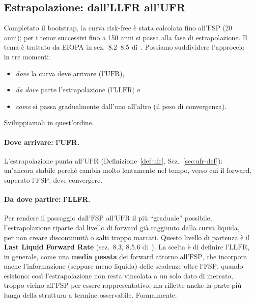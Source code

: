 \documentclass[11pt,a4paper]{article}
\theoremstyle{plain}
\theoremstyle{definition}
\theoremstyle{remark}
\newcommand{\UFR}{\mathrm{UFR}}
\newcommand{\LLFR}{\mathrm{LLFR}}
\newcommand{\FSP}{\mathrm{FSP}}
\begin{document}
\subsection{Estrapolazione: dall'LLFR all'UFR}
\label{sec:estrapolazione}

Completato il bootstrap, la curva risk-free è stata calcolata fino all'$\FSP$ (20 anni); per i tenor successivi fino a 150 anni si passa alla
fase di estrapolazione. Il tema è trattato da EIOPA in
sez.~8.2--8.5 di~\cite{eiopa2026}.
Possiamo suddividere l'approccio in tre momenti: \begin{itemize}
  \item \emph{dove} la curva deve arrivare (l'$\UFR$),
  \item \emph{da dove} parte l'estrapolazione (l'$\LLFR$) e
  \item \emph{come} si passa gradualmente dall'uno all'altro (il peso di convergenza).
\end{itemize}
Sviluppiamoli in quest'ordine.

\paragraph{Dove arrivare: l'UFR.}
L'estrapolazione punta all'$\UFR$ (Definizione~\ref{def:ufr}, Sez.~\ref{sec:ufr-def}):
un'ancora stabile perch\'e cambia molto lentamente nel tempo, verso cui il forward, superato
l'$\FSP$, deve convergere.

\paragraph{Da dove partire: l'LLFR.}
Per rendere il passaggio dall'$\FSP$ all'$\UFR$ il più ``graduale'' possibile, l'estrapolazione
riparte dal livello di forward gi\`a raggiunto dalla curva liquida, per non creare
discontinuit\`a o salti troppo marcati.
Questo livello di partenza \`e il \textbf{Last Liquid Forward Rate} (sez.~8.3,
8.5.6 di~\cite{eiopa2026}). La scelta è di definire l'$\LLFR$, in generale, come una
\textbf{media pesata} dei forward attorno all'$\FSP$, che incorpora anche l'informazione
(seppure meno liquida) delle scadenze oltre l'$\FSP$, quando esistono: cos\`i l'estrapolazione
non resta vincolata a un solo dato di mercato, troppo vicino all'$\FSP$ per essere
rappresentativo, ma riflette anche la parte pi\`u lunga della struttura a termine osservabile. Formalmente:
\end{document}
